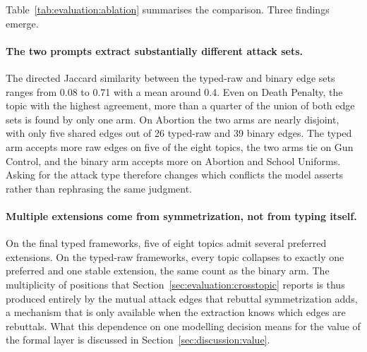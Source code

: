 Table~\ref{tab:evaluation:ablation} summarises the comparison. Three findings
emerge.

\paragraph{The two prompts extract substantially different attack sets.}
The directed Jaccard similarity between the typed-raw and binary edge sets
ranges from 0.08 to 0.71 with a mean around 0.4. Even on Death Penalty, the
topic with the highest agreement, more than a quarter of the union of both edge
sets is found by only one arm. On Abortion the two arms are nearly disjoint,
with only five shared edges out of 26 typed-raw and 39 binary edges. The typed
arm accepts more raw edges on five of the eight topics, the two arms tie on
Gun Control, and the binary arm
accepts more on Abortion and School Uniforms. Asking for the attack type
therefore changes which conflicts the model asserts rather than rephrasing the
same judgment.

\paragraph{Multiple extensions come from symmetrization, not from typing
itself.}
On the final typed frameworks, five of eight topics admit several preferred
extensions. On the typed-raw frameworks, every topic collapses to exactly one
preferred and one stable extension, the same count as the binary arm. The
multiplicity of positions that Section~\ref{sec:evaluation:crosstopic} reports
is thus produced entirely by the mutual attack edges that rebuttal
symmetrization adds, a mechanism that is only available when the extraction
knows which edges are rebuttals. What this dependence on one modelling
decision means for the value of the formal layer is discussed in
Section~\ref{sec:discussion:value}.

